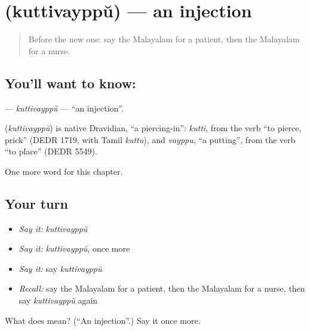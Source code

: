 \section[\texorpdfstring{\ml{കുത്തിവയ്പ്പ്} (kuttivayppŭ)}{കുത്തിവയ്പ്പ് (kuttivayppŭ)}]{ (kuttivayppŭ) — an injection}

\label{lesson:ML-C312-kuttivayppu}



\begin{quote}
Before the new one: say the Malayalam for a patient, then the Malayalam for a nurse.
\end{quote}

\subsection*{You'll want to know: }
\textbf{} — \emph{kuttivayppŭ} — \textquotedblleft{}an injection\textquotedblright{}.

\begin{cousinweb}
\textbf{} (\emph{kuttivayppŭ}) is native Dravidian, \textquotedblleft{}a piercing-in\textquotedblright{}: \emph{kutti}, from the verb \textquotedblleft{}to pierce, prick\textquotedblright{} (DEDR 1719, with Tamil \emph{kuttu}), and \emph{vayppu}, \textquotedblleft{}a putting\textquotedblright{}, from the verb \textquotedblleft{}to place\textquotedblright{} (DEDR 5549).
\end{cousinweb}

\begin{grammarlens}[title={What you've built}]
One more word for this chapter.
\end{grammarlens}

\subsection*{Your turn}
\begin{itemize}
\raggedright
  \item \emph{Say it:} \emph{kuttivayppŭ}
  \item \emph{Say it:} \emph{kuttivayppŭ}, once more
  \item \emph{Say it:} say \emph{kuttivayppŭ}
  \item \emph{Recall:} say the Malayalam for a patient, then the Malayalam for a nurse, then say \emph{kuttivayppŭ} again
\end{itemize}

\begin{tcolorbox}[breakable,colback=teal!4,colframe=teal!35!black,title={Before you move on}]
What does  mean? (\textquotedblleft{}An injection\textquotedblright{}.) Say it once more.
\end{tcolorbox}
